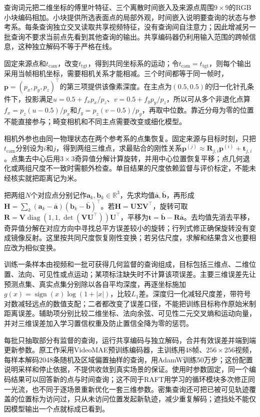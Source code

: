 查询词元把二维坐标的傅里叶特征、三个离散时间嵌入及来源点周围$9\times9$的RGB小块编码相加。小块提供所选表面点的局部外观，时间嵌入说明要查询的状态与参考系。每条查询独立交叉读取共享视频特征，没有查询间自注意力；因此增减另一批查询不要求当前点先看到其他查询的输出。共享编码器仍利用输入范围的跨帧信息，这种独立解码不等于严格在线。

固定来源点和$t_{\mathrm{cam}}$，改变$t_{\mathrm{tgt}}$，得到共同坐标系的运动；令$t_{\mathrm{cam}}=t_{\mathrm{tgt}}$，则每个输出采用当帧相机坐标，需要相机关系才能相减。三个时间都等于同一帧时，$\bm{p}=(p_x,p_y,p_z)^\top$的第三项提供该像素深度。在主点为$(0.5,0.5)$的归一化针孔条件下，投影满足$u=0.5+f_xp_x/p_z$、$v=0.5+f_yp_y/p_z$，所以可从多个非退化点算$f_x=p_z(u-0.5)/p_x$和$f_y=p_z(v-0.5)/p_y$，再取中位数。靠近分母为零的位置不能直接参与；畸变相机和不同主点需要改变或细化模型。

相机外参也由同一物理状态在两个参考系的点集恢复。固定来源与目标时刻，只把$t_{\mathrm{cam}}$分别设为$i$和$j$，得到两组三维点，求最贴合的刚性关系$\bm{p}^{(j)}\approx\bm{R}_{j,i}\bm{p}^{(i)}+\bm{t}_{j,i}$。点集去中心后用$3\times3$奇异值分解计算旋转，并用中心位置恢复平移；点几何退化或两组尺度不一致时需额外检查。单目结果的尺度依赖监督与评价标定，不能未经核实就把距离记为米。

把两组$N$个对应点分别记作$\bm{a}_k,\bm{b}_k\in\mathbb{R}^3$，先求均值$\bar{\bm{a}},\bar{\bm{b}}$，再形成$\bm{H}=\sum_k(\bm{a}_k-\bar{\bm{a}})(\bm{b}_k-\bar{\bm{b}})^\top$。若$\bm{H}=\bm{U}\bm{\Sigma}\bm{V}^{\top}$，旋转可取$\bm{R}=\bm{V}\operatorname{diag}(1,1,\det(\bm{V}\bm{U}^{\top}))\bm{U}^{\top}$，平移为$\bm{t}=\bar{\bm{b}}-\bm{R}\bar{\bm{a}}$。去均值先消去平移，奇异值分解在对应方向中寻找总平方误差较小的旋转；行列式修正确保旋转没有变成镜像反射。这里按共同尺度恢复刚性变换；若另估尺度，求解和结果含义也要相应改为相似变换。

训练一条样本由视频和一批可获得几何监督的查询组成，目标包括三维点、二维位置、法向、可见性或点运动；某项标注缺失时不计算该项误差。主要三维误差先让预测点集、真实点集分别除以各自平均深度，再逐坐标施加$g(x)=\operatorname{sign}(x)\log(1+|x|)$，比较$L_1$差。深度归一化减轻尺度差，带符号对数减轻远点的数值支配；二者都改变了误差口径，不能把训练目标称作原始米制距离误差。辅助项分别比较二维坐标、法向余弦、可见性二元交叉熵和运动向量，并对三维误差加入学习置信权重及防止置信全降为零的惩罚。

每批只抽取部分有监督的查询，运行共享编码与独立解码，合并有效误差并端到端更新参数。原工作采用VideoMAE预训练编码器，主训练用48帧、$256\times256$视频，每样本解码2048条随机及区域偏置抽样的查询，用AdamW训练50万步；这份配置说明采样和停止依据，不提供收敛到真实场景的保证。使用时参数固定，同一个编码结果可以回答新的点与时间查询；这不同于RAFT用学习的循环模块多次修正同一光流，也不同于逐场景重新优化一套三维参数。密集查询还可把已被可见轨迹覆盖的位置标为访问过，只从未访问位置发起新轨迹，减少重复解码；遮挡处不能仅因模型输出一个点就标成已看到。

